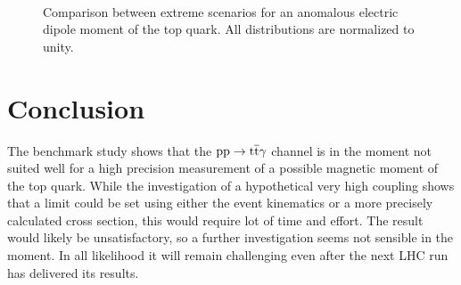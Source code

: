 \begin{figure}
  \\
  \caption{Comparison between extreme scenarios for an anomalous electric dipole moment of the top quark. All distributions are normalized to unity.}
  \label{fig_ano_comp_ex}
\end{figure}

\section{Conclusion}

The benchmark study shows that the $\mathrm{pp} \to \mathrm{t}\overline{\mathrm{t}} \gamma$ channel is in the moment not suited well for a high precision measurement of a possible magnetic moment of the top quark. While the investigation of a hypothetical very high coupling shows that a limit could be set using either the event kinematics or a more precisely calculated cross section, this would require lot of time and effort. The result would likely be unsatisfactory, so a further investigation seems not sensible in the moment. In all likelihood it will remain challenging even after the next LHC run has delivered its results. 